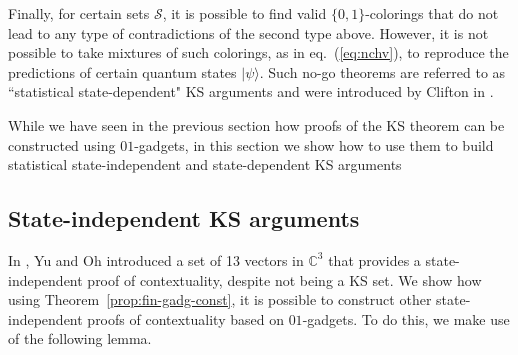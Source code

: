 \documentclass[twocolumn, a4paper, superscriptaddress,nofootinbib, accepted=2020-08-07, hyperref]{quantumarticle}
\begin{document}
Finally, for certain sets $\mathcal{S}$, it is possible to find valid $\{0,1\}$-colorings that do not lead to any type of contradictions of the second type above. However, it is not possible to take mixtures of such colorings, as in eq.~(\ref{eq:nchv}), to reproduce the predictions of certain quantum states $|\psi\rangle$. Such no-go theorems are referred to as ``statistical state-dependent" KS arguments and were introduced by Clifton in \cite{Clifton93}.

While we have seen in the previous section how proofs of the KS theorem can be constructed using $01$-gadgets, in this section we show how to use them to build statistical state-independent and state-dependent KS arguments

\subsection{State-independent KS arguments}
In \cite{YO12}, Yu and Oh introduced a set of 13 vectors in $\mathbb{C}^ 3$ that provides a state-independent proof of contextuality, despite not being a KS set. We show how using Theorem~\ref{prop:fin-gadg-const}, it is possible to construct other state-independent proofs of contextuality based on $01$-gadgets.  To do this, we make use of the following lemma.
\end{document}
